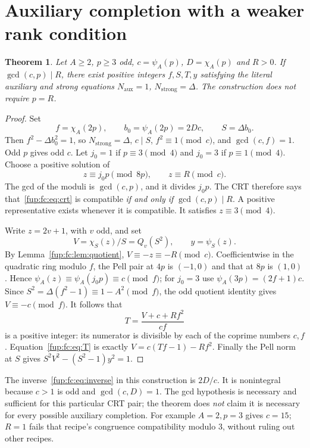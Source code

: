 \documentclass[11pt,letterpaper]{article}
\newtheorem{theorem}{Theorem}[section]
\theoremstyle{definition}\newtheorem{definition}[theorem]{Definition}
\theoremstyle{remark}\newtheorem{remark}[theorem]{Remark}
\newcommand{\D}{\Delta}
\newcommand{\ch}[2]{\chi_{#1}(#2)}\newcommand{\ps}[2]{\psi_{#1}(#2)}
\newcommand{\Na}{N_{\mathrm{aux}}}\newcommand{\Nk}{N_{\mathrm{index}}}\newcommand{\Nt}{N_{\mathrm{transport}}}
\newcommand{\Ns}{N_{\mathrm{strong}}}
\begin{document}
\section{Auxiliary completion with a weaker rank condition}
\label{fup:fc:sec:completion}
\begin{theorem}\label{fup:fc:thm:completion}
Let $A\ge2$, $p\ge3$ odd, $c=\ps A p$, $D=\ch A p$ and $R>0$.
If $\gcd(c,p)\mid R$, there exist positive integers $f,S,T,y$ satisfying
the literal auxiliary and strong equations $\Na=1$, $\Ns=\D$.
The construction does not require $p=R$.
\end{theorem}
\begin{proof}
Set
\[
 f=\ch A{2p},\qquad b_0=\ps A{2p}=2Dc,\qquad S=\D b_0.
\]
Then $f^2-\D b_0^2=1$, so $\Ns=\D$, $c\mid S$,
$f^2\equiv1\pmod c$, and $\gcd(c,f)=1$. Odd $p$ gives odd $c$.
Let $j_0=1$ if $p\equiv3\pmod4$ and $j_0=3$ if $p\equiv1\pmod4$.
Choose a positive solution of
\begin{equation}
 z\equiv j_0p\pmod{8p},\qquad z\equiv R\pmod c.\label{fup:fc:eq:crt}
\end{equation}
The gcd of the moduli is $\gcd(c,p)$, and it divides $j_0p$.
The CRT therefore says that~\eqref{fup:fc:eq:crt} is compatible
\emph{if and only if} $\gcd(c,p)\mid R$. A positive representative
exists whenever it is compatible. It satisfies $z\equiv3\pmod4$.

Write $z=2v+1$, with $v$ odd, and set
\[
 V=\ch S z/S=Q_v(S^2),\qquad y=\ps S z.
\]
By Lemma~\ref{fup:fc:lem:quotient}, $V\equiv-z\equiv-R\pmod c$.
Coefficientwise in the quadratic ring modulo $f$, the Pell pair at
$4p$ is $(-1,0)$ and that at $8p$ is $(1,0)$. Hence
$\ps A z\equiv\ps A{j_0p}\equiv c\pmod f$; for $j_0=3$ use
$\ps A{3p}=(2f+1)c$.
Since $S^2=\D(f^2-1)\equiv1-A^2\pmod f$, the odd quotient identity
gives $V\equiv-c\pmod f$.
It follows that
\begin{equation}
 T=\frac{V+c+Rf^2}{cf}\label{fup:fc:eq:T}
\end{equation}
is a positive integer: its numerator is divisible by each of the
coprime numbers $c,f$. Equation~\eqref{fup:fc:eq:T} is exactly
$V=c(Tf-1)-Rf^2$. Finally the Pell norm at $S$ gives
$S^2V^2-(S^2-1)y^2=1$.
\end{proof}

The inverse~\eqref{fup:fc:eq:inverse} in this construction is $2D/c$.
It is nonintegral because $c>1$ is odd and $\gcd(c,D)=1$.
The gcd hypothesis is necessary and sufficient for this particular CRT
pair; the theorem does \emph{not} claim it is necessary for every possible
auxiliary completion. For example $A=2,p=3$ gives $c=15$; $R=1$
fails that recipe's congruence compatibility modulo 3, without ruling
out other recipes.
\end{document}

